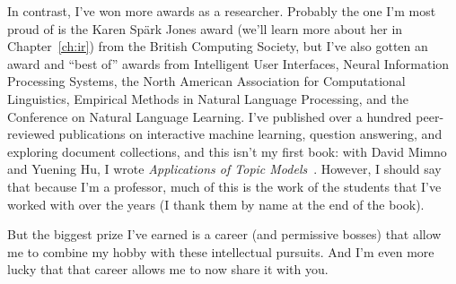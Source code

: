 In contrast, I've won more awards as a researcher.
%
Probably the one I'm most proud of is the Karen Sp\"ark Jones award (we'll
learn more about her in Chapter~\ref{ch:ir}) from the British Computing Society,
but I've also gotten an  award and ``best of'' awards from Intelligent User
Interfaces, Neural Information Processing Systems, the North American
Association for Computational Linguistics, Empirical Methods in
Natural Language Processing, and the Conference on Natural
Language Learning.
%
I've published over a hundred peer-reviewed publications on interactive
machine learning, question answering, and exploring document collections, and
this isn't my first book: with David Mimno and Yuening Hu, I wrote
\emph{Applications of Topic Models}~\citep{boyd-graber-17}.
%
However, I should say that because I'm a professor, much of this is the work of
the students that I've worked with over the years (I thank them by name at the
end of the book).

But the biggest prize I've earned is a career (and permissive
bosses) that allow me to combine my hobby with these intellectual pursuits.
%
And I'm even more lucky that that career allows me to now share it with you.

